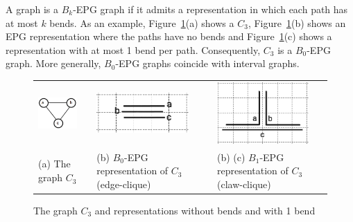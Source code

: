 \documentclass[
submission
]{dmtcs-episciences}
\begin{document}
 
 A graph is a $ B_k$-EPG graph if it admits a representation in which each path has at most $k$ bends. As an example, Figure~\ref{fig:trianguloepgRepresentacao}(a) shows a $C_3$, Figure~\ref{fig:trianguloepgRepresentacao}(b) shows an EPG representation where the paths have no bends and Figure~\ref{fig:trianguloepgRepresentacao}(c) shows a representation with at most 1 bend per path.   
 Consequently, $C_3$ is a $B_0$-EPG graph. More generally, $B_0$-EPG graphs coincide with interval graphs.

%
\begin{figure}[h]
  \centering
  \begin{tabular}{ p{3cm} p{0.7cm} p{4cm} p{0.7cm} p{4cm} }
    \includegraphics[width=2.3cm]{trianguloabc} && \includegraphics[width=3.5cm]{b0epgTransparenciaGrade2} & &
    \includegraphics[width=3.5cm]{b1EpgTransparenteGrade2}
    \\
    \footnotesize %
    (a) The  graph $C_3$ && \footnotesize(b) $B_0$-EPG representation of $C_3$ (edge-clique)&& \footnotesize(b) (c) $B_1$-EPG representation of $C_3$ (claw-clique)\\
  \end{tabular}

 \caption{The  graph $ C_3 $  and  representations without bends and with 1 bend} \label{fig:trianguloepgRepresentacao}
\end{figure}
\end{document}

